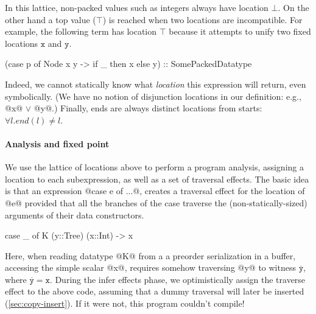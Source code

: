 \documentclass[a4paper,english]{lipics-v2016}
\newcommand{\fixed}[1]{\ensuremath{\texttt{#1}}}
\newcommand{\locend}[1]{\ensuremath{\overline{#1}}}
\begin{document}
In this lattice, non-packed values such as integers always have location $\bot$.
On the other hand a
top value ($\top$) is reached
when two locations are incompatible.  For example, the following term has
location $\top$ because it attempts to unify two fixed locations \fixed{x} and \fixed{y}.

\begin{code}
(case p of Node x y -> if _ then x else y) :: SomePackedDatatype
\end{code}

Indeed, we cannot statically know what {\em location} this expression will
return, even symbolically.  (We have no notion of disjunction locations in our
definition: e.g., @x@ $\vee$ @y@.)
Finally, ends are always distinct locations from starts: $\forall l . end(l) \neq l$.




\paragraph*{Analysis and fixed point}

We use the lattice of locations above to perform a program analysis, assigning a
location to each subexpression, as well as a set of traversal effects.  The
basic idea is that an expression @case e of ...@, creates a traversal effect for
the location of @e@ provided that all the branches of the case traverse the
(non-statically-sized) arguments of their data constructors.
%
\begin{code}
  case _ of K (y::Tree) (x::Int) -> x
\end{code}
%
Here, when reading datatype @K@ from a a preorder serialization in a buffer,
accessing the simple scalar @x@, requires somehow traversing @y@ to witness
\locend{\fixed{y}}, where $\locend{\fixed{y}} = \fixed{x}$.  During the infer
effects phase, we optimistically assign the traverse effect to the above code,
assuming that a dummy traversal will later be inserted (\cref{sec:copy-insert}).
%
If it were not, this program couldn't compile!
\end{document}
